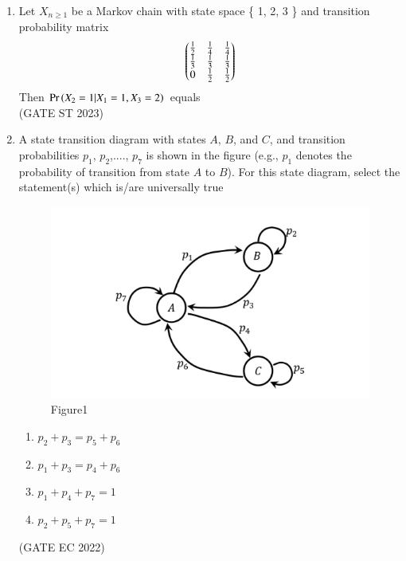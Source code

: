 \begin{enumerate}[label=\thechapter.\arabic*,ref=\thechapter.\theenumi]
\item Let $ X_{n \ge 1} $ be a Markov chain with state space \{ 1, 2, 3 \} and transition
probability matrix
$$ \begin{pmatrix}\frac{1}{2} & \frac{1}{4} & \frac{1}{4} \\
\frac{1}{3} & \frac{1}{3} & \frac{1}{3} \\
0 & \frac{1}{2} & \frac{1}{2}
\end{pmatrix}$$
Then $\Pr\left(X_2=1|X_1=1,X_3=2\right)$ equals\\
\hfill (GATE ST 2023)\\
\solution

\item A state transition diagram with states $A$, $B$, and $C$, and transition probabilities $p_1$, $p_2$,...., $p_7$ is shown in the figure (e.g., $p_1$ denotes the probability of transition from state $A$ to $B$). For this state diagram, select the statement(s) which is/are universally true
\begin{figure}[ht!]
	\centering
	\includegraphics[width=\columnwidth]{2022/EC/48/figs/fig.png}
    \caption{Figure1}
	\label{Fig:Figure1}
\end{figure}
\begin{enumerate}
\item $p_2 + p_3 = p_5 + p_6$\label{eq:28/2022/12}
\item $p_1 + p_3 = p_4 + p_6$
\item $p_1 + p_4 + p_7 = 1$\label{eq:28/2022/2}
\item $p_2 + p_5 +p_7 = 1$
\end{enumerate}
\hfill (GATE EC 2022)\\

\end{enumerate}
